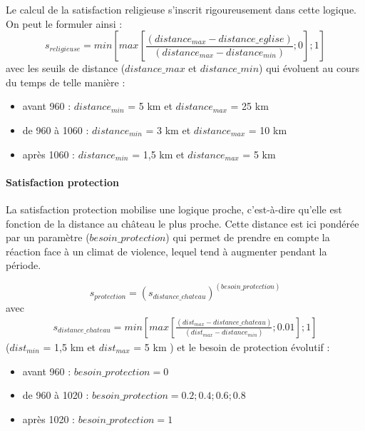 Le calcul de la satisfaction religieuse s'inscrit rigoureusement dans cette logique.
On peut le formuler ainsi :
		\begin{equation*}
		s_{religieuse} = min  \left \lbrack max \left \lbrack \frac{(distance_{max} - distance\_eglise)}{(distance_{max} -distance_{min})}; 0 \right \rbrack ; 1 \right \rbrack
		\end{equation*}
avec les seuils de distance ($distance\_max$ et $distance\_min$) qui évoluent au cours du temps de telle manière :
\begin{itemize}
	\item avant 960 : $distance_{min}$ = 5 km et $distance_{max}$ =  25 km
	\item de 960 à 1060 : $distance_{min}$ = 3 km et $distance_{max}$ =  10 km
	\item après 1060 : $distance_{min}$ = 1,5 km et $distance_{max}$ =  5 km
\end{itemize}
	
\paragraph{Satisfaction protection}	

La satisfaction protection mobilise une logique proche, c'est-à-dire qu'elle est fonction de la distance au château le plus proche.
Cette distance est ici pondérée par un paramètre ($besoin\_protection$) qui permet de prendre en compte la réaction face à un climat de violence, lequel tend à augmenter pendant la période.

\begin{equation*}
s_{protection} = (s_{distance\_chateau})^{(besoin\_protection)}
\end{equation*}
avec
\begin{equation*}
\begin{gathered}
s_{distance\_chateau} = min  \left \lbrack
max \left \lbrack \frac{(dist_{max} - distance\_chateau)}{(dist_{max} -distance_{min})}; 0.01 \right \rbrack ; 1 \right \rbrack
\end{gathered}
\end{equation*}
($dist_{min}$ = 1,5 km et $dist_{max}$ = 5 km )
et le besoin de protection évolutif :
\begin{itemize}
	\item avant 960 : $besoin\_protection = 0 $
	\item de 960 à 1020 : $besoin\_protection = 0.2 ; 0.4 ; 0.6 ; 0.8$
	\item après 1020 : $besoin\_protection = 1$
\end{itemize}


